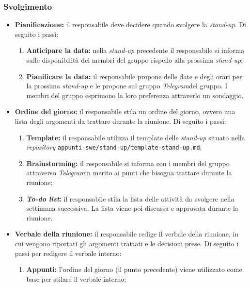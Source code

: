 \subsubsection{Svolgimento}
\begin{itemize}

	\item \textbf{Pianificazione:} il responsabile deve decidere quando
	      svolgere la \textit{stand-up}. Di seguito i passi:
	      \begin{enumerate}
		      \item \textbf{Anticipare la data:} nella \textit{stand-up}
		            precedente il responsabile si informa sulle disponibilità
		            dei membri del gruppo rispello alla prossima
		            \textit{stand-up};

		      \item \textbf{Pianificare la data:} il responsabile propone delle
		            date e degli orari per la prossima \textit{stand-up} e le
		            propone sul gruppo \textit{Telegram}\g del gruppo. I membri
		            del gruppo esprimono la loro preferenza attraverlo un
		            sondaggio.
	      \end{enumerate}

	\item \textbf{Ordine del giorno:} il responsabile stila un ordine del
	      giorno, ovvero una lista degli argomenti da trattare durante la
	      riunione. Di seguito i passi:
	      \begin{enumerate}
		      \item \textbf{Template:} il responsabile utilizza il template
		            delle \textit{stand-up} situato nella \textit{repository\g}
		            \texttt{appunti-swe/stand-up/template-stand-up.md};

		      \item \textbf{Brainstorming:} il responsabile si informa con i
		            membri del gruppo attraverso \textit{Telegram}\g in merito ai
		            punti che bisogna trattare durante la riunione;

		      \item \textbf{\textit{To-do list}:} il responsabile stila la lista
		            delle attività da svolgere nella settimana successiva. La
		            lista viene poi discussa e approvata durante la riunione.
	      \end{enumerate}

	\item \textbf{Verbale della riunione:} il responsabile redige il
	      verbale della riunione, in cui vengono riportati gli argomenti
	      trattati e le decisioni prese. Di seguito i passi per redigere il
	      verbale interno:
	      \begin{enumerate}
		      \item \textbf{Appunti:} l'ordine del giorno (il punto precedente)
		            viene utilizzato come base per stilare il verbale interno;


\end{enumerate}
\end{itemize}
